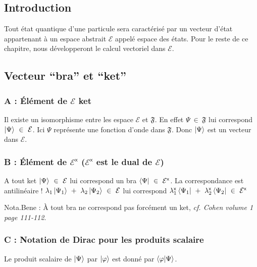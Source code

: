 \documentclass[12pt,a4paper,titlepage]{book}
\begin{document}
\subsection{Introduction}

Tout état quantique d'une particule sera caractérisé par un vecteur d'état appartenant à un espace abstrait $\mathcal{E}$ appelé espace des états. Pour le reste de ce chapitre, nous développeront le calcul vectoriel dans $\mathcal{E}$.

\subsection{Vecteur \enquote{bra} et \enquote{ket}}
\subsubsection{A : Élément de $\mathcal{E}$ ket}

Il existe un isomorphisme entre les espace $\mathcal{E}$ et $\mathfrak{F}$. En effet $\Psi ~\in~ \mathfrak{F}$ lui correspond $\ket{\Psi} ~\in~ \mathcal{E}$. Ici $\Psi$ représente une fonction d'onde dans $\mathfrak{F}$. Donc $\ket{\Psi}$ est un vecteur dans $\mathcal{E}$.

\subsubsection{B : Élément de $\mathcal{E}^{\mathsf{x}}$ ($\mathcal{E}^{\mathsf{x}}$ est le dual de $\mathcal{E}$)}

A tout ket $\ket{\Psi} ~\in~ \mathcal{E}$ lui correspond un bra $\bra{\Psi} ~\in~ \mathcal{E}^{\mathsf{x}}$. La correspondance est antilinéaire ! $\lambda_1 \ket{\Psi_1} ~+~ \lambda_2 \ket{\Psi_2} ~\in~ \mathcal{E}$ lui correspond $\lambda_1^{\mathsf{x}} \bra{\Psi_1} ~+~ \lambda_2^{\mathsf{x}} \bra{\Psi_2} ~\in~ \mathcal{E}^{\mathsf{x}}$

Nota.Bene : À tout bra ne correspond pas forcément un ket, \textit{cf. Cohen volume 1 page 111-112}.

\subsubsection{C : Notation de Dirac pour les produits scalaire}

Le produit scalaire de $\ket{\Psi}$ par $\ket{\varphi}$ est donné par $\braket{\varphi | \Psi}$.\\
\end{document}
